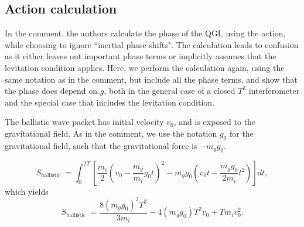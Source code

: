 \documentclass[aps,prx,onecolumn,superscriptaddress,longbibliography]{revtex4-2}
\begin{document}
\begin{appendix}

\section{Action calculation}
In the comment, the authors calculate the phase of the QGI, using the action, while choosing to ignore ``inertial phase shifts". The calculation leads to confusion as it either leaves out important phase terms or implicitly assumes that the levitation condition applies. Here, we perform the calculation again, using the same notation as in the comment, but include all the phase terms, and show that the phase does depend on $g$, both in the general case of a closed $T^3$ interferometer and the special case that includes the levitation condition.

The ballistic wave packet has initial velocity $v_0$, and is exposed to the gravitational field. As in the comment, we use the notation $g_0$ for the gravitational field, such that the gravitational force is $-m_g g_0$.

\begin{equation}
    S_{\text {ballistic }} = \int_0^{2 T}\left[\frac{m_i}{2}\left(v_0-\frac{m_g}{m_i} g_0 t\right)^2-m_g g_0\left(v_0 t-\frac{m_g g_0}{2 m_i} t^2\right)\right] d t ,
\end{equation}
which yields
\begin{equation}
    S_{\text {ballistic }} =  \frac{8 (m_g g_0)^{2} T^{3}}{3 m_{i}} - 4 (m_g g_0) T^{2} v_{0} + T m_{i} v_{0}^{2} .
\end{equation}


\end{appendix}
\end{document}
